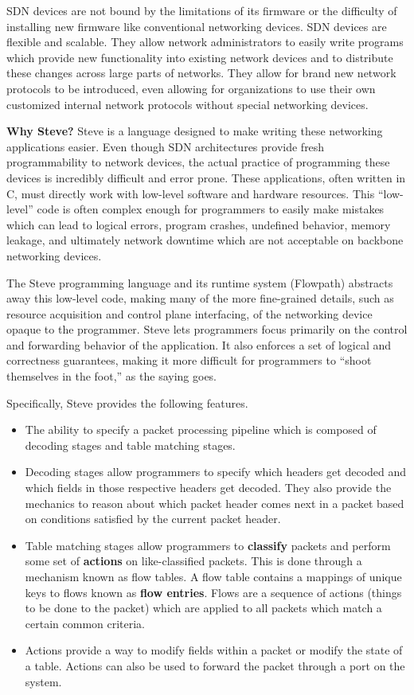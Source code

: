 SDN devices are not bound by the limitations of its firmware or the difficulty of installing new firmware like conventional networking devices. SDN devices are flexible and scalable. They allow network administrators to easily write programs which provide new functionality into existing network devices and to distribute these changes across large parts of networks. They allow for brand new network protocols to be introduced, even allowing for organizations to use their own customized internal network protocols without special networking devices.

\textbf{Why Steve?} Steve is a language designed to make writing these networking applications easier. Even though SDN architectures provide fresh programmability to network devices, the actual practice of programming these devices is incredibly difficult and error prone. These applications, often written in C, must directly work with low-level software and hardware resources. This “low-level” code is often complex enough for programmers to easily make mistakes which can lead to logical errors, program crashes, undefined behavior, memory leakage, and ultimately network downtime which are not acceptable on backbone networking devices.

The Steve programming language and its runtime system (Flowpath) abstracts away this low-level code, making many of the more fine-grained details, such as resource acquisition and control plane interfacing, of the networking device opaque to the programmer. Steve lets programmers focus primarily on the control and forwarding behavior of the application. It also enforces a set of logical and correctness guarantees, making it more difficult for programmers to “shoot themselves in the foot,” as the saying goes.

Specifically, Steve provides the following features.

\begin{itemize}
\item The ability to specify a packet processing pipeline which is composed of decoding stages and table matching stages.

\item Decoding stages allow programmers to specify which headers get decoded and which fields in those respective headers get decoded. They also provide the mechanics to reason about which packet header comes next in a packet based on conditions satisfied by the current packet header.

\item 
Table matching stages allow programmers to \textbf{classify} packets and perform some set of \textbf{actions} on like-classified packets. This is done through a mechanism known as flow tables. A flow table contains a mappings of unique keys to flows known as \textbf{flow entries}. Flows are a sequence of actions (things to be done to the packet) which are applied to all packets which match a certain common criteria.

\item
Actions provide a way to modify fields within a packet or modify the state of a table. Actions can also be used to forward the packet through a port on the system.

\end{itemize}

